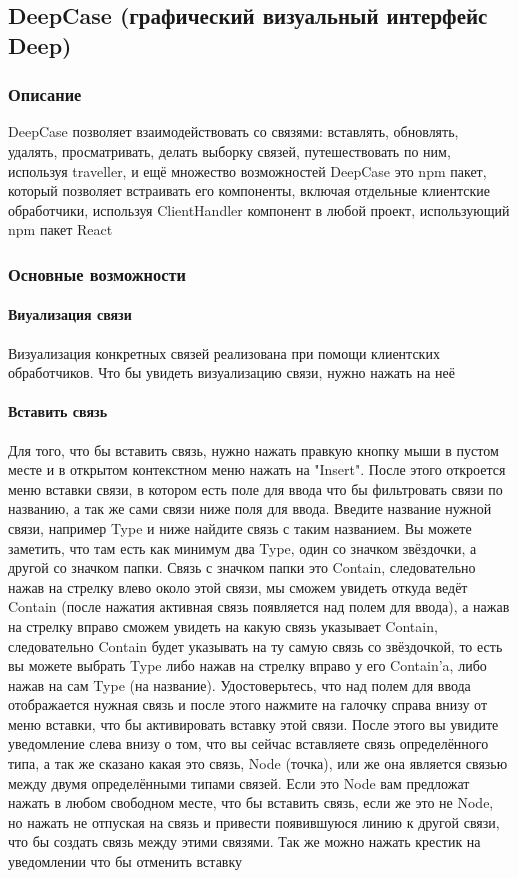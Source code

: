 \documentclass{article}
\begin{document}
\subsection{DeepCase (графический визуальный интерфейс Deep)}
\subsubsection{Описание}
DeepCase позволяет взаимодействовать со связями: вставлять,
обновлять, удалять, просматривать, делать выборку связей,
путешествовать по ним, используя traveller, и ещё множество возможностей
DeepCase это npm пакет, который позволяет встраивать его компоненты, включая
отдельные клиентские обработчики, используя ClientHandler компонент в любой
проект, использующий npm пакет React
\subsubsection{Основные возможности}
\paragraph{Виуализация связи}
Визуализация конкретных связей реализована при помощи клиентских обработчиков.
Что бы увидеть визуализацию связи, нужно нажать на неё
\paragraph{Вставить связь}
Для того, что бы вставить связь, нужно нажать правкую кнопку мыши в пустом
месте и в открытом контекстном меню нажать на "Insert". После этого откроется
меню вставки связи, в котором есть поле для ввода что бы фильтровать связи по
названию, а так же сами связи ниже поля для ввода. Введите название нужной
связи, например Type и ниже найдите связь с таким названием. Вы можете
заметить, что там есть как минимум два Type, один со значком звёздочки, а
другой со значком папки. Связь с значком папки это Contain, следовательно нажав
на стрелку влево около этой связи, мы сможем увидеть откуда ведёт Contain
(после нажатия активная связь появляется над полем для ввода), а нажав на
стрелку вправо сможем увидеть на какую связь указывает Contain, следовательно
Contain будет указывать на ту самую связь со звёздочкой, то есть вы можете
выбрать Type либо нажав на стрелку вправо у его Contain'a, либо нажав на сам
Type (на название). Удостоверьтесь, что над полем для ввода отображается нужная
связь и после этого нажмите на галочку справа внизу от меню вставки, что бы
активировать вставку этой связи. После этого вы увидите уведомление слева внизу
о том, что вы сейчас вставляете связь определённого типа, а так же сказано
какая это связь, Node (точка), или же она является связью между двумя
определёнными типами связей. Если это Node вам предложат нажать в любом
свободном месте, что бы вставить связь, если же это не Node, но нажать не
отпуская на связь и привести появившуюся линию к другой связи, что бы создать
связь между этими связями. Так же можно нажать крестик на уведомлении что бы
отменить вставку
\end{document}
